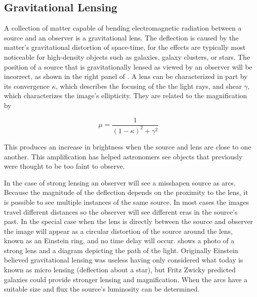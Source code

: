 
\subsection{Gravitational Lensing}
\label{subsec:gravitational_lensing}
A collection of matter capable of bending electromagnetic radiation between a source and an observer is a gravitational
lens.  The deflection is caused by the matter's gravitational distortion of space-time, for
the effects are typically most noticeable for high-density objects
such as galaxies, galaxy clusters, or stars.  The position of a source that is gravitationally lensed as viewed by an observer will be
incorrect, as shown in the right panel of .  A lens can be characterized in part by its convergence
$\kappa$, which describes the focusing of the the light rays, and shear $\gamma$, which characterizes the image's ellipticity.  They
are related to the magnification by

\begin{equation}
\mu = \frac{1}{(1-\kappa)^{2} + \gamma^{2}}
\end{equation}

\noindent This produces an increase in brightness when the source and lens are close to one another.  This amplification has helped
astronomers see objects that previously were thought to be too faint to observe.

In the case of strong lensing an observer will see a misshapen source as arcs.  Because the magnitude of the
deflection depends on the proximity to the lens, it is possible to see multiple instances of the same source.  In most cases the images
travel different distances so the observer will see different eras in the source's past.  In the special case
when the lens is directly between the source and observer the image will appear as a circular distortion of the source around the lens,
known as an Einstein ring, and no time delay will occur.  
shows a photo of a strong lens and a diagram depicting the path of the light.  Originally Einstein
believed gravitational lensing was useless having only considered what today is known as micro lensing (deflection
about a star), but Fritz Zwicky predicted galaxies could provide stronger lensing and
magnification.  When the arcs have a suitable size and flux the source's luminosity can be determined.

